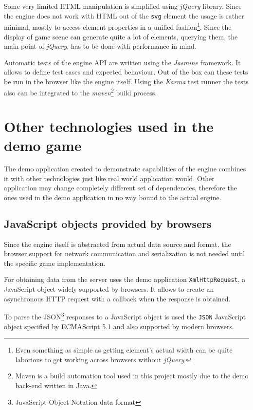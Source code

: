 \documentclass[11pt,oneside, final]{fithesis2}
\begin{document}
Some very limited HTML manipulation is simplified using \emph{jQuery} library. Since the engine does not work with HTML out of the \texttt{svg} element the usage is rather minimal, mostly to access element properties in a unified fashion\footnote{Even something as simple as getting element's actual width can be quite laborious to get working across browsers without \emph{jQuery}.}. Since the display of game scene can generate quite a lot of elements, querying them, the main point of \emph{jQuery}\cite{jquery}, has to be done with performance in mind.

Automatic tests of the engine API are written using the \emph{Jasmine} framework. It allows to define test cases and expected behaviour\cite{jasmine}. Out of the box can these tests be run in the browser like the engine itself. Using the \emph{Karma} test runner the tests also can be integrated to the \emph{maven}\footnote{Maven is a build automation tool\cite{maven} used in this project mostly due to the demo back-end written in Java.} build process\cite{karma}.

\section{Other technologies used in the demo game}
The demo application created to demonstrate capabilities of the engine combines it with other technologies just like real world application would. Other application may change completely different set of dependencies, therefore the ones used in the demo application in no way bound to the actual engine.

\subsection{JavaScript objects provided by browsers}
Since the engine itself is abstracted from actual data source and format, the browser support for network communication and serialization is not needed until the specific game implementation.

For obtaining data from the server uses the demo application \texttt{XmlHttpRequest}, a JavaScript object widely supported by browsers\cite{xhr}. It allows to create an asynchronous HTTP request with a callback when the response is obtained.

To parse the JSON\footnote{JavaScript Object Notation data format} responses to a JavaScript object is used the \texttt{JSON} JavaScript object specified by ECMAScript 5.1 and also supported by modern browsers\cite{json}.
\end{document}
